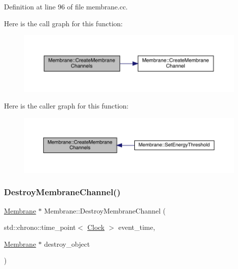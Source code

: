 Definition at line 96 of file membrane.\+cc.

Here is the call graph for this function\+:
\nopagebreak
\begin{figure}[H]
\begin{center}
\leavevmode
\includegraphics[width=350pt]{class_membrane_a72987fae41e552af5befcd9a62aa6e46_cgraph}
\end{center}
\end{figure}
Here is the caller graph for this function\+:
\nopagebreak
\begin{figure}[H]
\begin{center}
\leavevmode
\includegraphics[width=350pt]{class_membrane_a72987fae41e552af5befcd9a62aa6e46_icgraph}
\end{center}
\end{figure}
\mbox{\label{class_membrane_a12413d933a62b3bbb7931c6ab25de7de}} 
\subsubsection{\texorpdfstring{Destroy\+Membrane\+Channel()}{DestroyMembraneChannel()}}
{\footnotesize\ttfamily \hyperlink{class_membrane}{Membrane} $\ast$ Membrane\+::\+Destroy\+Membrane\+Channel (\begin{DoxyParamCaption}\item[{std\+::chrono\+::time\+\_\+point$<$ \hyperlink{universe_8h_a0ef8d951d1ca5ab3cfaf7ab4c7a6fd80}{Clock} $>$}]{event\+\_\+time,  }\item[{\hyperlink{class_membrane}{Membrane} $\ast$}]{destroy\+\_\+object }\end{DoxyParamCaption})}



